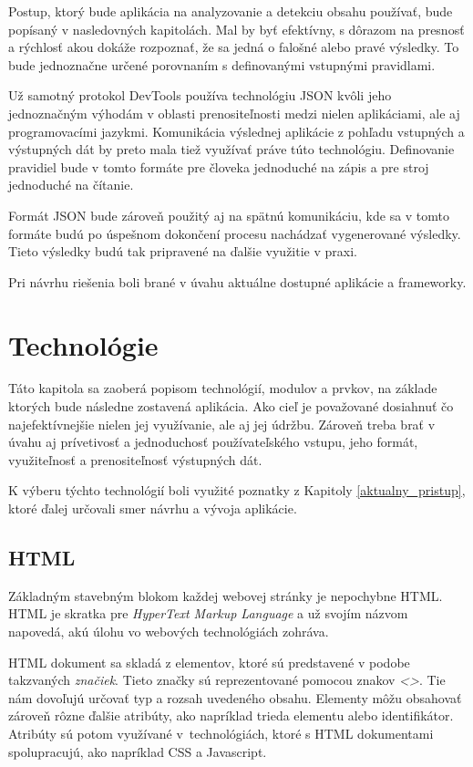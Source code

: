 Postup, ktorý bude aplikácia na analyzovanie a detekciu obsahu používať, bude popísaný v nasledovných kapitolách. Mal by byť efektívny, s dôrazom na presnosť a rýchlosť akou dokáže rozpoznať, že sa jedná o falošné alebo pravé výsledky. To bude jednoznačne určené porovnaním s definovanými vstupnými pravidlami.

\bigskip

Už samotný protokol DevTools používa technológiu JSON kvôli jeho jednoznačným výhodám v oblasti prenositeľnosti medzi nielen aplikáciami, ale aj programovacími jazykmi. Komunikácia výslednej aplikácie z pohľadu vstupných a výstupných dát by preto mala tiež využívať práve túto technológiu. Definovanie pravidiel bude v tomto formáte pre človeka jednoduché na zápis a pre stroj jednoduché na čítanie. 

Formát JSON bude zároveň použitý aj na spätnú komunikáciu, kde sa v tomto formáte budú po úspešnom dokončení procesu nachádzať vygenerované výsledky. Tieto výsledky budú tak pripravené na ďalšie využitie v praxi.

Pri návrhu riešenia boli brané v úvahu aktuálne dostupné aplikácie a frameworky. 


\chapter{Technológie}
\label{Technologie}

Táto kapitola sa zaoberá popisom technológií, modulov a prvkov, na základe ktorých bude následne zostavená aplikácia. Ako cieľ je považované dosiahnuť čo najefektívnejšie nielen jej využívanie, ale aj jej údržbu. Zároveň treba brať v úvahu aj prívetivosť a jednoduchosť používateľského vstupu, jeho formát, využiteľnosť a prenositeľnosť výstupných dát. 

K výberu týchto technológií boli využité poznatky z Kapitoly \ref{aktualny_pristup}, ktoré ďalej určovali smer návrhu a vývoja aplikácie.

\section{HTML}

Základným stavebným blokom každej webovej stránky je nepochybne HTML. HTML je skratka pre \textit{HyperText Markup Language} a už svojím názvom napovedá, akú úlohu vo webových technológiách zohráva. 

HTML dokument sa skladá z elementov, ktoré sú predstavené v podobe takzvaných \textit{značiek}. Tieto značky sú reprezentované pomocou znakov \textit{<>}. Tie nám dovoľujú určovať typ a rozsah uvedeného obsahu. Elementy môžu obsahovať zároveň rôzne ďalšie atribúty, ako napríklad trieda elementu alebo identifikátor. Atribúty sú potom využívané v~technológiách, ktoré s HTML dokumentami spolupracujú, ako napríklad CSS a Javascript.


